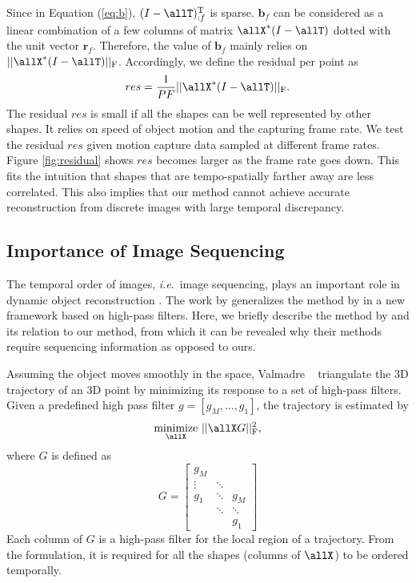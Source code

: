 Since in Equation (\ref{eq:b}), $(I-\allT)_{:f}^\text{T}$ is sparse. $\mathbf{b}_f$ can be considered as a linear combination of a few columns of matrix $\allX^*(I-\allT)$ dotted with the unit vector $\mathbf{r}_f$.
Therefore, the value of $\mathbf{b}_f$ mainly relies on $||\allX^*(I-\allT)||_\text{F}$.
Accordingly, we define the residual per point as
\begin{equation}
res = \frac{1}{PF}||\allX^*(I-\allT)||_\text{F}. \label{eq:residual}
\end{equation}
The residual $res$ is small if all the shapes can be well represented by other shapes. It relies on speed of object motion and the capturing frame rate. 
We test the residual $res$ given motion capture data sampled at different frame rates. Figure \ref{fig:residual} shows $res$ becomes larger as the frame rate goes down. This fits the intuition that shapes that are tempo-spatially farther away are less correlated. This also implies that our method cannot achieve accurate reconstruction from discrete images with large temporal discrepancy. 


\subsection{Importance of Image Sequencing} \label{sec:importance_of_image_sequencing}
The temporal order of images, \emph{i.e}.~image sequencing, plays an important role in dynamic object reconstruction \cite{Park_ECCV2010,Valmadre_CVPR2012}. The work by \cite{Valmadre_CVPR2012} generalizes the method by \cite{Park_ECCV2010} in a new framework based on high-pass filters. Here, we briefly describe the method by \citet{Valmadre_CVPR2012} and its relation to our method, from which it can be revealed why their methods \cite{Park_ECCV2010,Valmadre_CVPR2012} require sequencing information as opposed to ours. 

Assuming the object moves smoothly in the space, Valmadre \etal~\cite{Valmadre_CVPR2012} triangulate the 3D trajectory of an 3D point by minimizing its response to a set of high-pass filters.
Given a predefined high pass filter $g=[g_M,\dots,g_1]$, the trajectory is estimated by 
\begin{equation}
\underset{\allX}{\text{minimize}} ~ || \allX G||_\text{F}^2,
\label{eq:valmadre_equ}
\end{equation}
where $G$ is defined as
\begin{equation}
G = \left[ 
\begin{matrix}
g_M  	&  		 &   	  	\\
\vdots	& \ddots &    	  	\\
g_1		& \ddots & g_M	  	\\
		& \ddots & \ddots 	\\
		&		 & g_1	
\end{matrix}
\right]
\label{eq:valmadre_filter_G}
\end{equation}
Each column of $G$ is a high-pass filter for the local region of a trajectory. From the formulation, it is required for all the shapes (columns of $\allX$) to be ordered temporally. 


